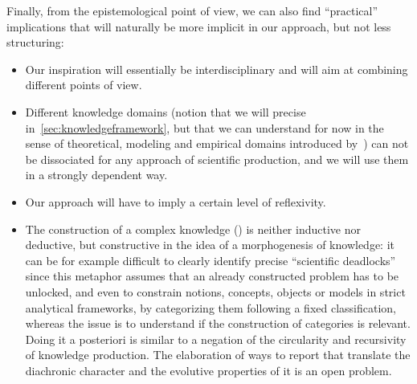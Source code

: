 Finally, from the epistemological point of view, we can also find ``practical'' implications that will naturally be more implicit in our approach, but not less structuring:

\begin{itemize}
	\item Our inspiration will essentially be interdisciplinary and will aim at combining different points of view.
	\item Different knowledge domains (notion that we will precise in~\ref{sec:knowledgeframework}, but that we can understand for now in the sense of theoretical, modeling and empirical domains introduced by~\cite{livet2010}) can not be dissociated for any approach of scientific production, and we will use them in a strongly dependent way.
	\item Our approach will have to imply a certain level of reflexivity.
	\item The construction of a complex knowledge (\cite{morin1991methode}) is neither inductive nor deductive, but constructive in the idea of a morphogenesis of knowledge: it can be for example difficult to clearly identify precise ``scientific deadlocks'' since this metaphor assumes that an already constructed problem has to be unlocked, and even to constrain notions, concepts, objects or models in strict analytical frameworks, by categorizing them following a fixed classification, whereas the issue is to understand if the construction of categories is relevant. Doing it a posteriori is similar to a negation of the circularity and recursivity of knowledge production. The elaboration of ways to report that translate the diachronic character and the evolutive properties of it is an open problem.
\end{itemize}





\footnotesize

\begin{multicols}{2}


\end{multicols}






